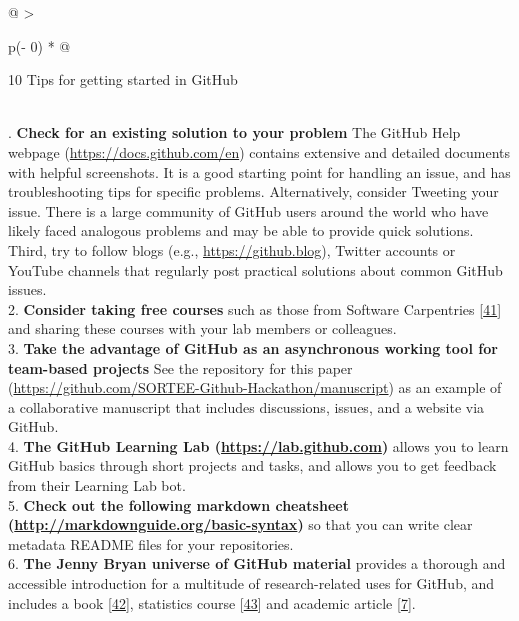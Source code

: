 \begin{tablenos:no-prefix-table-caption}

\begin{longtable}[]{@{}
  >{\raggedright\arraybackslash}p{(\columnwidth - 0\tabcolsep) * }@{}}
\toprule
\begin{minipage}[b]{\linewidth}\raggedright
10 Tips for getting started in GitHub
\end{minipage} \\
\midrule
{}. \textbf{Check for an existing solution to your problem} The GitHub Help webpage (\url{https://docs.github.com/en}) contains extensive and detailed documents with helpful screenshots. It is a good starting point for handling an issue, and has troubleshooting tips for specific problems. Alternatively, consider Tweeting your issue. There is a large community of GitHub users around the world who have likely faced analogous problems and may be able to provide quick solutions. Third, try to follow blogs (e.g., \url{https://github.blog}), Twitter accounts or YouTube channels that regularly post practical solutions about common GitHub issues. \\
2. \textbf{Consider taking free courses} such as those from Software Carpentries {[}\protect\hyperlink{ref-pjy75gHr}{41}{]} and sharing these courses with your lab members or colleagues. \\
3. \textbf{Take the advantage of GitHub as an asynchronous working tool for team-based projects} See the repository for this paper (\url{https://github.com/SORTEE-Github-Hackathon/manuscript}) as an example of a collaborative manuscript that includes discussions, issues, and a website via GitHub. \\
4. \textbf{The GitHub Learning Lab (\url{https://lab.github.com})} allows you to learn GitHub basics through short projects and tasks, and allows you to get feedback from their Learning Lab bot. \\
5. \textbf{Check out the following markdown cheatsheet (\url{http://markdownguide.org/basic-syntax})} so that you can write clear metadata README files for your repositories. \\
6. \textbf{The Jenny Bryan universe of GitHub material} provides a thorough and accessible introduction for a multitude of research-related uses for GitHub, and includes a book {[}\protect\hyperlink{ref-ZvrOcg9w}{42}{]}, statistics course {[}\protect\hyperlink{ref-6CMMeSeD}{43}{]} and academic article {[}\protect\hyperlink{ref-RVetqmsg}{7}{]}. \\

\end{longtable}
\end{tablenos:no-prefix-table-caption}
